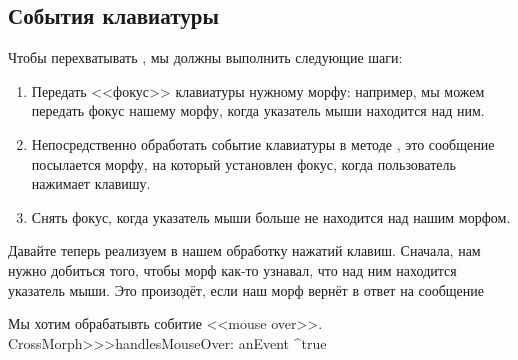 \documentclass[a4paper,10pt,twoside]{book}
\begin{document}
\subsection{События клавиатуры}

Чтобы перехватывать , мы должны выполнить следующие шаги:
\begin{enumerate}
	\item Передать <<фокус>> клавиатуры нужному морфу: например, мы можем передать фокус нашему морфу, когда указатель мыши находится над ним.
	\item Непосредственно обработать событие клавиатуры в методе , это сообщение посылается морфу, на который установлен фокус, когда пользователь нажимает клавишу.
	\item Снять фокус, когда указатель мыши больше не находится над нашим морфом.
\end{enumerate}

Давайте теперь реализуем в нашем  обработку нажатий клавиш.
Сначала, нам нужно добиться того, чтобы морф как-то узнавал, что над ним находится указатель мыши.
Это произодёт, если наш морф вернёт  в ответ на сообщение 

\begin{method}{Мы хотим обрабатывть собитие <<mouse over>>.} 
CrossMorph>>>handlesMouseOver: anEvent
	^true
\end{method}
\end{document}
